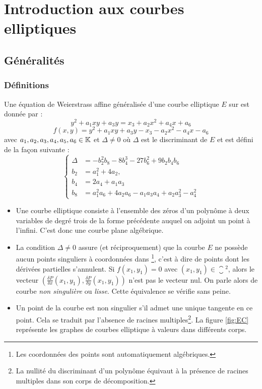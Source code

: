 \chapter{Introduction aux courbes elliptiques}
\section{Généralités}
\subsection{Définitions}
\begin{definition}
Une équation de Weierstrass affine généralisée d'une courbe elliptique $E$ sur \field{} est donnée par :
\begin{equation}
y^2 + a_1 xy + a_3 y = x_3 + a_2x^2 + a_4x + a_6
\end{equation}
\begin{equation}
f(x, y) = y^2 + a_1 xy + a_3 y - x_3 - a_2x^2 - a_4x - a_6
\end{equation}
avec $a_1, a_2, a_3, a_4, a_5, a_6  \in \mathbb{K}{}$ et $\Delta \neq 0$ où $\Delta$ est le discriminant de $E$ et est défini de la façon suivante : 
\begin{equation}
\begin{cases}
\Delta & = -b_2^2 b_8 - 8b_4^3 - 27b_6^2 + 9 b_2b_4b_6\\
b_2 &= a_1^2 + 4a_2,\\
b_4 &= 2a_4 + a_1a_3\\
b_8 &= a_1^2a_6 + 4a_2a_6 - a_1a_3a_4 + a_2a_3^2 - a_4^2
\end{cases}
\end{equation}
\end{definition}

\vspace{0.5cm}

\begin{itemize}[label=--]
    \item Une courbe elliptique consiste à l'ensemble des zéros d'un polynôme à deux variables de degré trois de la forme précédente auquel on adjoint un point à l'infini. C'est donc une courbe plane algébrique.
    \item La condition $\Delta \neq 0$ assure (et réciproquement) que la courbe $E$ ne possède aucun points singuliers à coordonnées dans \closure{} \footnote{Les coordonnées des points sont automatiquement algébriques.}, c'est à dire de points dont les dérivées partielles s'annulent. Si $f(x_1, y_1) = 0$ avec $(x_1, y_1) \in \closure{}^2$, alors le vecteur $\left (\frac{\delta P}{\delta x}(x_1, y_1), \frac{\delta P}{\delta y}(x_1, y_1) \right )$ n'est pas le vecteur nul. On parle alors de courbe \emph{non singulière} ou \emph{lisse}. Cette équivalence se vérifie sans peine. 
    \item Un point de la courbe est non singulier s'il admet une unique tangente en ce point. Cela se traduit par l'absence de racines multiples\footnote{La nullité du discriminant d'un polynôme équivaut à la présence de racines multiples dans son corps de décomposition.}. La figure \ref{fig:EC} représente les graphes de courbes elliptique à valeurs dans différents corps.
\end{itemize}

